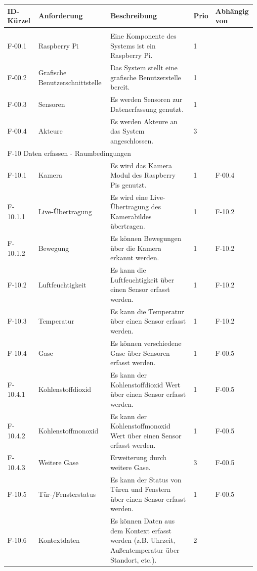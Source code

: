 \begin{tabularx}{\textwidth}{|l|X|X|l|l|}
	\toprule
	\textbf{ID-Kürzel} & \textbf{Anforderung} & \textbf{Beschreibung} & \textbf{Prio} & \textbf{Abhängig von} \\
	\hline
	\endhead
	\hline
	\caption{Anforderungen}
	\label{tab:anforderungen}
	\endfoot
	\multicolumn{5}{|l|}{F-00 Allgemein}\\
	\hline
	F-00.1 & Raspberry Pi & Eine Komponente des Systems ist ein Raspberry Pi. & 1 & \\
	F-00.2 & Grafische Benutzerschnittstelle & Das System stellt eine grafische Benutzerstelle bereit. & 1 & \\
	F-00.3 & Sensoren & Es werden Sensoren zur Datenerfassung genutzt. & 1 & \\
	F-00.4 & Akteure & Es werden Akteure an das System angeschlossen. & 3 & \\
	\hline
	\multicolumn{5}{|l|}{F-10 Daten erfassen - Raumbedingungen}\\
	\hline
	F-10.1   & Kamera & Es wird das Kamera Modul des Raspberry Pis genutzt. & 1 & F-00.4\\
	F-10.1.1 & Live-Übertragung & Es wird eine Live-Übertragung des Kamerabildes übertragen. & 1 & F-10.2 \\
	F-10.1.2 & Bewegung & Es können Bewegungen über die Kamera erkannt werden. & 1 & F-10.2 \\
	F-10.2 & Luftfeuchtigkeit & Es kann die Luftfeuchtigkeit über einen Sensor erfasst werden. & 1 & F-10.2 \\
	F-10.3 & Temperatur & Es kann die Temperatur über einen Sensor erfasst werden. & 1 & F-10.2 \\
	F-10.4 & Gase & Es können verschiedene Gase über Sensoren erfasst werden.  & 1 & F-00.5\\
	F-10.4.1 & Kohlenstoffdioxid & Es kann der Kohlenstoffdioxid Wert über einen Sensor erfasst werden. & 1 & F-00.5\\
	F-10.4.2 & Kohlenstoffmonoxid & Es kann der Kohlenstoffmonoxid Wert über einen Sensor erfasst werden. & 1 & F-00.5\\
	F-10.4.3 & Weitere Gase & Erweiterung durch weitere Gase. & 3 & F-00.5\\
	F-10.5 & Tür-/Fensterstatus & Es kann der Status von Türen und Fenstern über einen Sensor erfasst werden.  & 1 & F-00.5\\
	F-10.6 & Kontextdaten & Es können Daten aus dem Kontext erfasst werden (z.B. Uhrzeit, Außentemperatur über Standort, etc.). & 2 & \\  

\end{tabularx}
